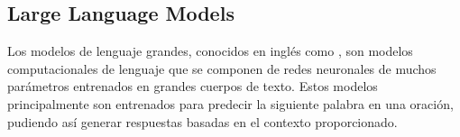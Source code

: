 \subsection{Large Language Models}
Los modelos de lenguaje grandes, conocidos en inglés como , son modelos computacionales de lenguaje que se componen de redes neuronales de muchos parámetros entrenados en grandes cuerpos de texto. Estos modelos principalmente son entrenados para predecir la siguiente palabra en una oración, pudiendo así generar respuestas basadas en el contexto proporcionado.
